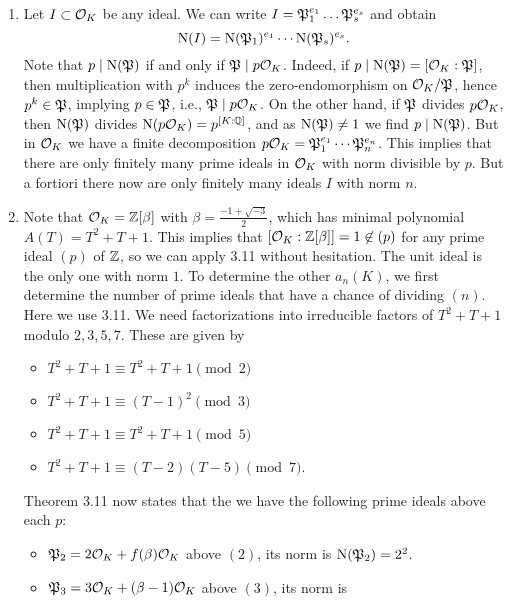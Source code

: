 \documentclass[a4paper,11pt]{article}
\begin{document}
\begin{enumerate}[labelindent=0pt, wide]
    \item Let $I \subset \mathcal{O}_K$ be any ideal. We can write $I = \mathfrak{P}_1^{e_1} \dots
        \mathfrak{P}_s^{e_s}$ and obtain $$\operatorname{N}(I) = \operatorname{N}(\mathfrak{P}_1)^{e_1} \cdots
        \operatorname{N}(\mathfrak{P}_s)^{e_s}.$$
        Note that $p \mid \operatorname{N}(\mathfrak{P})$ if and only if $\mathfrak{P} \mid p\mathcal{O}_K$. Indeed,
        if $p \mid \operatorname{N}(\mathfrak{P}) = [\mathcal{O}_K:\mathfrak{P}]$, then multiplication with $p^k$
        induces the zero-endomorphism on $\mathcal{O}_K/\mathfrak{P}$, hence $p^k \in \mathfrak{P}$,
        implying $p \in \mathfrak{P}$, i.e., $\mathfrak{P} \mid p\mathcal{O}_K$. 
        On the other hand, if $\mathfrak{P}$ divides $p\mathcal{O}_K$, then 
        $\operatorname{N}(\mathfrak{P})$ divides $\operatorname{N}(p\mathcal{O}_K) = p^{[K:\mathbb{Q}]}$, and as
        $\operatorname{N}(\mathfrak{P}) \neq 1$ we find $p \mid \operatorname{N}(\mathfrak{P})$. But 
        in $\mathcal{O}_K$ we have a finite decomposition $p \mathcal{O}_K = 
        \mathfrak{P}_1^{e_1} \cdots \mathfrak{P}_n^{e_n}$. This implies that there are only finitely
        many prime ideals in $\mathcal{O}_K$ with norm divisible by $p$. 
        But a fortiori there now are only finitely many ideals $I$ with norm
        $n$.
\item Note that $\mathcal{O}_K = \mathbb{Z}[\beta]$ with $\beta = \frac{-1+\sqrt{-3}}2$,
        which has minimal polynomial $A(T) = T^2 + T + 1$. This implies that
        $[\mathcal{O}_K:\mathbb{Z}[\beta]]=1\not \in (p)$ for any prime ideal $(p)$ of $\mathbb{Z}$, so
        we can apply 3.11 without hesitation. The unit ideal is the only one
        with norm $1$. To determine the other $a_n(K)$, we first determine the
        number of prime ideals that have a chance of dividing $(n)$. Here we use
        3.11. We need factorizations into irreducible factors of $T^2 + T + 1$
        modulo $2, 3, 5, 7$. These are given by
        \begin{itemize}
            \item $T^2 + T + 1 \equiv T^2 + T + 1\pmod 2$
            \item $T^2 + T + 1 \equiv (T-1)^2    \pmod 3$
            \item $T^2 + T + 1 \equiv T^2 + T + 1\pmod 5$
            \item $T^2 + T + 1 \equiv (T-2)(T-5) \pmod 7$.
        \end{itemize}
        Theorem 3.11 now states that the we have the following prime ideals above
        each $p$:
        \begin{itemize}
            \item $\mathfrak{P}_2 = 2 \mathcal{O}_K + f(\beta) \mathcal{O}_K$ above $(2)$, its norm is 
                $\operatorname{N}(\mathfrak{P}_2) = 2^2$.
            \item $\mathfrak{P}_3 = 3 \mathcal{O}_K + (\beta- 1)\mathcal{O}_K$ above $(3)$, its norm is 

\end{itemize}
\end{enumerate}
\end{document}
